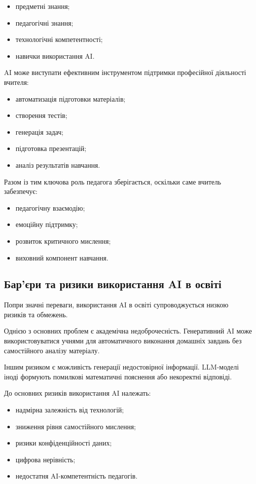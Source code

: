 \begin{itemize}
\item предметні знання;
\item педагогічні знання;
\item технологічні компетентності;
\item навички використання AI.
\end{itemize}

AI може виступати ефективним інструментом підтримки професійної діяльності вчителя:

\begin{itemize}
\item автоматизація підготовки матеріалів;
\item створення тестів;
\item генерація задач;
\item підготовка презентацій;
\item аналіз результатів навчання.
\end{itemize}

Разом із тим ключова роль педагога зберігається, оскільки саме вчитель забезпечує:

\begin{itemize}
\item педагогічну взаємодію;
\item емоційну підтримку;
\item розвиток критичного мислення;
\item виховний компонент навчання.
\end{itemize}

\subsection{Бар'єри та ризики використання AI в освіті}

Попри значні переваги, використання AI в освіті супроводжується низкою ризиків та обмежень.

Однією з основних проблем є академічна недоброчесність. Генеративний AI може використовуватися учнями для автоматичного виконання домашніх завдань без самостійного аналізу матеріалу.

Іншим ризиком є можливість генерації недостовірної інформації. LLM-моделі іноді формують помилкові математичні пояснення або некоректні відповіді.

До основних ризиків використання AI належать:

\begin{itemize}
\item надмірна залежність від технологій;
\item зниження рівня самостійного мислення;
\item ризики конфіденційності даних;
\item цифрова нерівність;
\item недостатня AI-компетентність педагогів.
\end{itemize}


